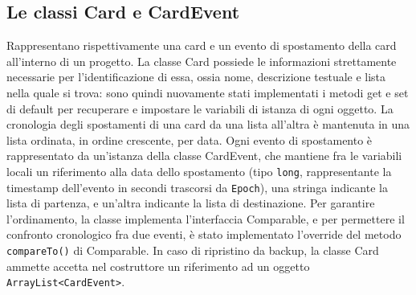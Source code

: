 \documentclass{article}
\begin{document}
\subsection{Le classi Card e CardEvent}
Rappresentano rispettivamente una card e un evento di spostamento della card all'interno di un progetto.
La classe Card possiede le informazioni strettamente necessarie per l'identificazione di essa, ossia nome, descrizione testuale e lista nella quale si trova: sono quindi nuovamente stati implementati i metodi get e set di default per recuperare e impostare le variabili di istanza di ogni oggetto. La cronologia degli spostamenti di una card da una lista all'altra è mantenuta in una lista ordinata, in ordine crescente, per data. Ogni evento di spostamento è rappresentato da un'istanza della classe CardEvent, che mantiene fra le variabili locali un riferimento alla data dello spostamento (tipo \texttt{long}, rappresentante la timestamp dell'evento in secondi trascorsi da \texttt{Epoch}), una stringa indicante la lista di partenza, e un'altra indicante la lista di destinazione. Per garantire l'ordinamento, la classe implementa l'interfaccia Comparable, e per permettere il confronto cronologico fra due eventi, è stato implementato l'override del metodo \texttt{compareTo()} di Comparable.
In caso di ripristino da backup, la classe Card ammette accetta nel costruttore un riferimento ad un oggetto \texttt{ArrayList<CardEvent>}.
\end{document}
